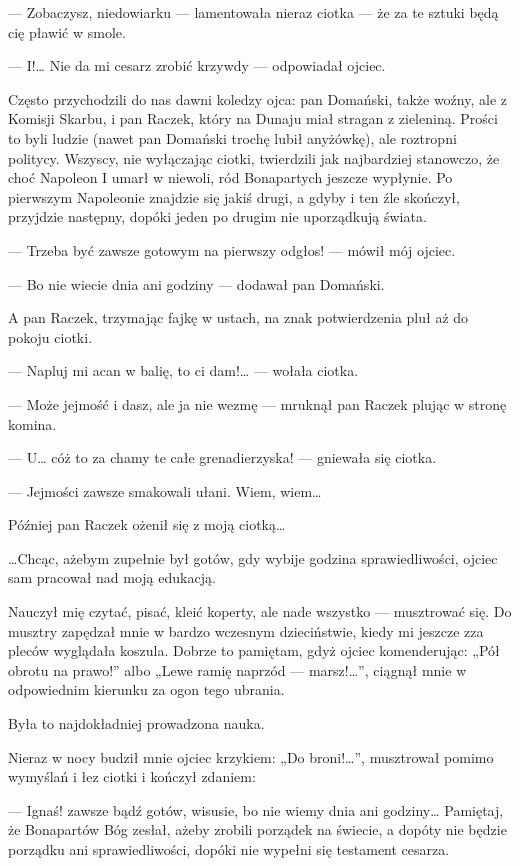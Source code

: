 \documentclass{book}
\begin{document}
— Zobaczysz, niedowiarku — lamentowała nieraz ciotka — że za te sztuki będą cię pławić w smole.

— I!… Nie da mi cesarz zrobić krzywdy — odpowiadał ojciec.

Często przychodzili do nas dawni koledzy ojca: pan Domański, także woźny, ale z Komisji Skarbu, i pan Raczek, który na Dunaju miał stragan z zieleniną. Prości to byli ludzie (nawet pan Domański trochę lubił anyżówkę), ale roztropni politycy. Wszyscy, nie wyłączając ciotki, twierdzili jak najbardziej stanowczo, że choć Napoleon I umarł w niewoli, ród Bonapartych jeszcze wypłynie. Po pierwszym Napoleonie znajdzie się jakiś drugi, a gdyby i ten źle skończył, przyjdzie następny, dopóki jeden po drugim nie uporządkują świata.

— Trzeba być zawsze gotowym na pierwszy odgłos! — mówił mój ojciec.

— Bo nie wiecie dnia ani godziny — dodawał pan Domański.

A pan Raczek, trzymając fajkę w ustach, na znak potwierdzenia pluł aż do pokoju ciotki.

— Napluj mi acan w balię, to ci dam!… — wołała ciotka.

— Może jejmość i dasz, ale ja nie wezmę — mruknął pan Raczek plując w stronę komina.

— U… cóż to za chamy te całe grenadierzyska! — gniewała się ciotka.

— Jejmości zawsze smakowali ułani. Wiem, wiem…

Później pan Raczek ożenił się z moją ciotką…

…Chcąc, ażebym zupełnie był gotów, gdy wybije godzina sprawiedliwości, ojciec sam pracował nad moją edukacją.

Nauczył mię czytać, pisać, kleić koperty, ale nade wszystko — musztrować się. Do musztry zapędzał mnie w bardzo wczesnym dzieciństwie, kiedy mi jeszcze zza pleców wyglądała koszula. Dobrze to pamiętam, gdyż ojciec komenderując: „Pół obrotu na prawo!” albo „Lewe ramię naprzód — marsz!…”, ciągnął mnie w odpowiednim kierunku za ogon tego ubrania.

Była to najdokładniej prowadzona nauka.

Nieraz w nocy budził mnie ojciec krzykiem: „Do broni!…”, musztrował pomimo wymyślań i łez ciotki i kończył zdaniem:

— Ignaś! zawsze bądź gotów, wisusie, bo nie wiemy dnia ani godziny… Pamiętaj, że Bonapartów Bóg zesłał, ażeby zrobili porządek na świecie, a dopóty nie będzie porządku ani sprawiedliwości, dopóki nie wypełni się testament cesarza.
\end{document}
